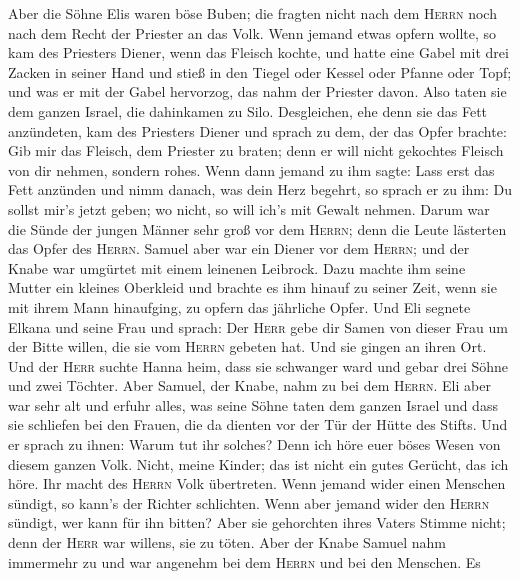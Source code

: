  Aber die Söhne Elis waren böse Buben; die fragten nicht
nach dem \textsc{Herrn}  noch nach dem Recht der Priester
an das Volk. Wenn jemand etwas opfern wollte, so kam des Priesters
Diener, wenn das Fleisch kochte, und hatte eine Gabel mit drei Zacken in
seiner Hand  und stieß in den Tiegel oder Kessel oder
Pfanne oder Topf; und was er mit der Gabel hervorzog, das nahm der
Priester davon. Also taten sie dem ganzen Israel, die dahinkamen zu
Silo.  Desgleichen, ehe denn sie das Fett anzündeten, kam
des Priesters Diener und sprach zu dem, der das Opfer brachte: Gib mir
das Fleisch, dem Priester zu braten; denn er will nicht gekochtes
Fleisch von dir nehmen, sondern rohes.  Wenn dann jemand
zu ihm sagte: Lass erst das Fett anzünden und nimm danach, was dein Herz
begehrt, so sprach er zu ihm: Du sollst mir's jetzt geben; wo nicht, so
will ich's mit Gewalt nehmen.  Darum war die Sünde der
jungen Männer sehr groß vor dem \textsc{Herrn}; denn die Leute lästerten
das Opfer des \textsc{Herrn}.  Samuel aber war ein Diener
vor dem \textsc{Herrn}; und der Knabe war umgürtet mit einem leinenen
Leibrock.  Dazu machte ihm seine Mutter ein kleines
Oberkleid und brachte es ihm hinauf zu seiner Zeit, wenn sie mit ihrem
Mann hinaufging, zu opfern das jährliche Opfer.  Und Eli
segnete Elkana und seine Frau und sprach: Der \textsc{Herr} gebe dir
Samen von dieser Frau um der Bitte willen, die sie vom \textsc{Herrn}
gebeten hat. Und sie gingen an ihren Ort.  Und der
\textsc{Herr} suchte Hanna heim, dass sie schwanger ward und gebar drei
Söhne und zwei Töchter. Aber Samuel, der Knabe, nahm zu bei dem
\textsc{Herrn}.  Eli aber war sehr alt und erfuhr alles,
was seine Söhne taten dem ganzen Israel und dass sie schliefen bei den
Frauen, die da dienten vor der Tür der Hütte des Stifts. 
Und er sprach zu ihnen: Warum tut ihr solches? Denn ich höre euer böses
Wesen von diesem ganzen Volk.  Nicht, meine Kinder; das
ist nicht ein gutes Gerücht, das ich höre. Ihr macht des \textsc{Herrn}
Volk übertreten.  Wenn jemand wider einen Menschen
sündigt, so kann's der Richter schlichten. Wenn aber jemand wider den
\textsc{Herrn} sündigt, wer kann für ihn bitten? Aber sie gehorchten
ihres Vaters Stimme nicht; denn der \textsc{Herr} war willens, sie zu
töten.  Aber der Knabe Samuel nahm immermehr zu und war
angenehm bei dem \textsc{Herrn} und bei den Menschen.  Es
